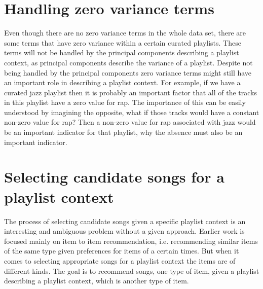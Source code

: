 \documentclass[a4paper,11pt]{kth-mag}
\begin{document}
\section{Handling zero variance terms}
Even though there are no zero variance terms in the whole data set, there are some terms that have zero variance within a certain curated playlists. These terms will not be handled by the principal components describing a playlist context, as principal components describe the variance of a playlist. Despite not being handled by the principal components zero variance terms might still have an important role in describing a playlist context. For example, if we have a curated jazz playlist then it is probably an important factor that all of the tracks in this playlist have a zero value for rap. The importance of this can be easily understood by imagining the opposite, what if those tracks would have a constant non-zero value for rap? Then a non-zero value for rap associated with jazz would be an important indicator for that playlist, why the absence must also be an important indicator.

\section{Selecting candidate songs for a playlist context}
The process of selecting candidate songs given a specific playlist context is an interesting and ambiguous problem without a given approach. Earlier work is focused mainly on item to item recommendation, i.e. recommending similar items of the same type given preferences for items of a certain times. But when it comes to selecting appropriate songs for a playlist context the items are of different kinds. The goal is to recommend songs, one type of item, given a playlist describing a playlist context, which is another type of item. 
\end{document}
